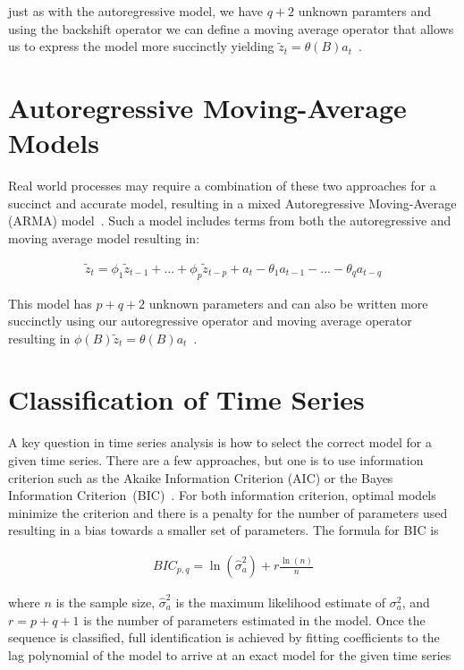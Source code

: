 \documentclass[oneside,12pt,openany]{book}
\begin{document}
	\noindent just as with the autoregressive model, we have $q+2$ unknown paramters and using the backshift operator we can define a moving average operator that allows us to express the model more succinctly yielding $\tilde{z}_{t}=\theta(B)a_{t}$~\cite{Box}.

	\section{Autoregressive Moving-Average Models}
	
	Real world processes may require a combination of these two approaches for a succinct and accurate model, resulting in a mixed Autoregressive Moving-Average (ARMA) model~\cite{Box}. Such a model includes terms from both the autoregressive and moving average model resulting in:
	
	\begin{align}
		\label{eqn:armamodel}
		\tilde{z}_{t}=\phi_{1} \tilde{z}_{t-1}+...+\phi_{p} \tilde{z}_{t-p}+a_{t}-\theta_{1}a_{t-1}-...-\theta_{q}a_{t-q}
	\end{align}
	
	\noindent This model has $p+q+2$ unknown parameters and can also be written more succinctly using our autoregressive operator and moving average operator resulting in $\phi(B)\tilde{z}_{t}=\theta(B)a_{t}$~\cite{Box}.

	\section{Classification of Time Series}\label{sec:timeseries:classification}

	A key question in time series analysis is how to select the correct model for a given time series. There are a few approaches, but one is to use information criterion such as the Akaike Information Criterion (AIC) or the Bayes Information Criterion~(BIC)~\cite{Box}. For both information criterion, optimal models minimize the criterion and there is a penalty for the number of parameters used resulting in a bias towards a smaller set of parameters. The formula for BIC is

	\begin{align}
		\label{eqn:bic}
		BIC_{p,q}=\ln(\hat{\sigma}_{a}^{2})+r\frac{\ln(n)}{n}
	\end{align}

	\noindent where $n$ is the sample size, $\hat{\sigma}_{a}^{2}$ is the maximum likelihood estimate of $\sigma_{a}^{2}$, and $r=p+q+1$ is the number of parameters estimated in the model. Once the sequence is classified, full identification is achieved by fitting coefficients to the lag polynomial of the model to arrive at an exact model for the given time series
    
\end{document}
